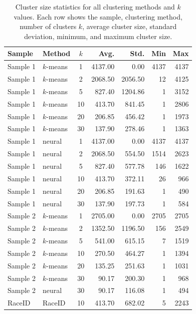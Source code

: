 \documentclass[unnumsec,webpdf,contemporary,large]{oup-authoring-template}
\begin{document}
\begin{table}[h!]
\centering
\caption{Cluster size statistics for all clustering methods and $k$ values. Each row shows the sample, clustering method, number of clusters $k$, average cluster size, standard deviation, minimum, and maximum cluster size.}
\begin{tabular}{l l c r r r r}
\hline
Sample & Method & $k$ & Avg. & Std. & Min & Max \\
\hline
Sample 1 & $k$-means & 1 & 4137.00 & 0.00 & 4137 & 4137 \\
Sample 1 & $k$-means & 2 & 2068.50 & 2056.50 & 12 & 4125 \\
Sample 1 & $k$-means & 5 & 827.40 & 1204.86 & 1 & 3152 \\
Sample 1 & $k$-means & 10 & 413.70 & 841.45 & 1 & 2806 \\
Sample 1 & $k$-means & 20 & 206.85 & 456.42 & 1 & 1973 \\
Sample 1 & $k$-means & 30 & 137.90 & 278.46 & 1 & 1363 \\
Sample 1 & neural & 1 & 4137.00 & 0.00 & 4137 & 4137 \\
Sample 1 & neural & 2 & 2068.50 & 554.50 & 1514 & 2623 \\
Sample 1 & neural & 5 & 827.40 & 577.78 & 146 & 1622 \\
Sample 1 & neural & 10 & 413.70 & 372.11 & 26 & 966 \\
Sample 1 & neural & 20 & 206.85 & 191.63 & 1 & 490 \\
Sample 1 & neural & 30 & 137.90 & 197.73 & 1 & 584 \\
Sample 2 & $k$-means & 1 & 2705.00 & 0.00 & 2705 & 2705 \\
Sample 2 & $k$-means & 2 & 1352.50 & 1196.50 & 156 & 2549 \\
Sample 2 & $k$-means & 5 & 541.00 & 615.15 & 7 & 1519 \\
Sample 2 & $k$-means & 10 & 270.50 & 464.27 & 1 & 1394 \\
Sample 2 & $k$-means & 20 & 135.25 & 251.63 & 1 & 1031 \\
Sample 2 & $k$-means & 30 & 90.17 & 200.30 & 1 & 968 \\
Sample 2 & neural & 30 & 90.17 & 116.08 & 1 & 494 \\
RaceID & RaceID & 10 & 413.70 & 682.02 & 5 & 2243 \\
\hline
\end{tabular}
\label{tab:cluster_size_stats}
\end{table}
\end{document}
